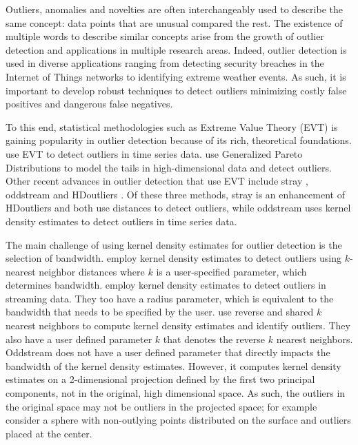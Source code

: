 \documentclass[letter,12pt]{article}
\begin{document}
Outliers, anomalies and novelties are often interchangeably used to describe the same concept: data points that are unusual compared the rest. The existence of multiple words to describe similar concepts arise from the growth of outlier detection and applications in multiple research areas.  Indeed, outlier detection is used in diverse applications ranging from detecting security breaches in the Internet of Things networks to identifying extreme weather events. As such, it is important to develop robust techniques to detect outliers minimizing costly false positives and dangerous false negatives. 

To this end, statistical methodologies such as Extreme Value Theory (EVT) is gaining popularity in outlier detection because of its rich, theoretical foundations. \cite{Burridge2006} use EVT to detect outliers in time series data. \cite{Clifton2014} use Generalized Pareto Distributions to model the tails in high-dimensional data and detect outliers. Other recent advances in outlier detection that use EVT include   stray \citep{pridiltal}, oddstream \citep{talagala2019anomaly} and HDoutliers \citep{wilkinson2017visualizing}. Of these three methods, stray is an enhancement of HDoutliers and both  use distances to detect outliers, while oddstream uses kernel density estimates to detect outliers in time series data.

The main challenge of using kernel density estimates for outlier detection is the selection of bandwidth. \cite{Schubert2014} employ kernel density estimates to detect outliers using $k$-nearest neighbor distances where $k$ is a user-specified parameter, which determines bandwidth. \cite{Qin2019} employ kernel density estimates to detect outliers in streaming data. They too have a radius parameter, which is equivalent to the bandwidth that needs to be specified by the user. \cite{Tang2017} use reverse and shared $k$ nearest neighbors to compute kernel density estimates and identify outliers. They also have a user defined parameter $k$ that denotes the reverse $k$ nearest neighbors.  Oddstream \citep{talagala2019anomaly} does not have a user defined parameter that directly impacts the bandwidth of the kernel density estimates. However, it computes kernel density estimates on a  2-dimensional projection defined by the first two principal components, not in the original, high dimensional space. As such, the outliers in the original space may not be outliers in the projected space; for example consider a sphere with non-outlying points distributed on the surface and outliers placed at the center. 
\end{document}
